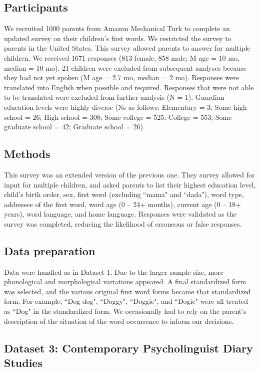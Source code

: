 \documentclass[10pt,letterpaper]{article}
\begin{document}
\subsection{Participants}
We recruited 1000 parents from Amazon Mechanical Turk to complete an updated survey on their children's first words. We restricted the survey to parents in the United States. This survey allowed parents to answer for multiple children. We received 1671 responses (813 female, 858 male; M age = 10 mo, median = 10 mo). 21 children were excluded from subsequent analyses because they had not yet spoken (M age = 2.7 mo, median = 2 mo). Responses were translated into English when possible and required. Responses that were not able to be translated were excluded from further analysis (N = 1). Guardian education levels were highly diverse (Ns as follows: Elementary = 3; Some high school = 26; High school = 308; Some college = 525; College = 553; Some graduate school = 42; Graduate school = 26). 

\subsection{Methods}
This survey was an extended version of the previous one. They survey allowed for input for multiple children, and asked parents to list their highest education level, child's birth order, sex,  first word (excluding ``mama" and ``dada"), word type, addressee of the first word, word age (0 – 24+ months), current age (0 – 18+ years), word language, and home language.  Responses were validated as the survey was completed, reducing the likelihood of erroneous or false responses. 

\subsection{Data preparation}
Data were handled as in Dataset 1. Due to the larger sample size, more phonological and morphological variations appeared. A final standardized form was selected, and the various original first word forms became that standardized form. For example,  ``Dog dog", ``Doggy", ``Doggie", and ``Dogie" were all treated as ``Dog" in the standardized form. We occasionally had to rely on the parent's description of the situation of the word occurrence to inform our decisions.

\subsection{Dataset 3: Contemporary Psycholinguist Diary Studies}
\end{document}
